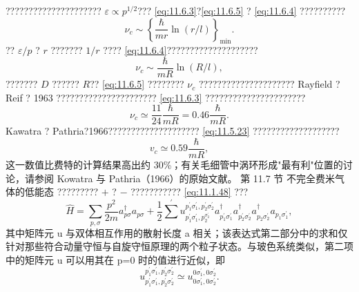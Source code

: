 ????????????????????? \(\varepsilon \propto p^{1/2}\)??? \autoref{eq:11.6.3}?\autoref{eq:11.6.5} ? \autoref{eq:11.6.4} ??????????
\begin{equation}\tag{11.6.4}\label{eq:11.6.4}
\nu _ { c } \sim \left\{ \frac { \hbar } { m r } \ln ( r / l ) \right\} _ { \mathrm { m i n } } .
\end{equation}
?? \(\varepsilon/p\) ? \(r\) ??????? \(1/r\) ???? \autoref{eq:11.6.4}????????????????????
\begin{equation}\tag{11.6.5}\label{eq:11.6.5}
\nu _ { c } \sim \frac { \hbar } { m R } \ln ( R / l ) ,
\end{equation}
??????? \(D\) ?????? \(R\)?? \autoref{eq:11.6.5} ???????? \(\nu_{c}\) ?????????????????????
Rayfield ? Reif ? 1963 ?????????????????????? \autoref{eq:11.6.3} ??????????????????????
\begin{equation}\tag{11.6.6}\label{eq:11.6.6}
\nu _ { c } \simeq \frac { 11 } { 24 } \frac { \hbar } { m R } = 0 . 46 \frac { \hbar } { m R } .
\end{equation}
Kawatra ? Pathria?1966???????????????????? \autoref{eq:11.5.23} ???????????????????
\begin{equation}\tag{11.6.7}\label{eq:11.6.7}
v _ { c } \simeq 0 . 59 \frac { \hbar } { m R } ,
\end{equation}
这一数值比费特的计算结果高出约 30\%；有关毛细管中涡环形成"最有利"位置的讨论，请参阅 Kowatra 与 Pathria（1966）的原始文献。
第 11.7 节 不完全费米气体的低能态
????????? \(+\) ? \(-\) ??????????? \autoref{eq:11.1.48} ???
\begin{equation}\tag{11.6.8}\label{eq:11.6.8}
\hat { H } = \sum _ { p , \sigma } \frac { p ^{2} } { 2 m } a _ { p \sigma } ^{\dagger} a _ { p \sigma } + \frac { 1 } { 2 } \sum ^{\prime} u _ { p _ { 1 } ^{\prime} \sigma _ { 1 } ^{\prime} , p _ { 2 } ^{\sigma _ { 2} ^{\prime} } } ^{p _ { 1} ^{\prime} \sigma _ { 1 } ^{\prime} , p _ { 2 } ^{\prime} \sigma _ { 2 } ^{\prime} } a _ { p _ { 1 } ^{\prime} \sigma _ { 1 } ^{\prime} } ^{\dagger} a _ { p _ { 2 } ^{\prime} \sigma _ { 2 } ^{\prime} } ^{\dagger} a _ { p _ { 2 } \sigma _ { 2 } ^{\prime} } ^{\dagger} a _ { p _ { 1 } \sigma _ { 1 } ^{\prime} } ,
\end{equation}
其中矩阵元 u 与双体相互作用的散射长度 a 相关；该表达式第二部分中的求和仅针对那些符合动量守恒与自旋守恒原理的两个粒子状态。与玻色系统类似，第二项中的矩阵元 u 可以用其在 p=0 时的值进行近似，即
\begin{equation}\tag{11.6.9}\label{eq:11.6.9}
u _ { p _ { 1 } ^{\prime} \sigma _ { 1 } ^{\prime} , p _ { 2 } ^{\prime} \sigma _ { 2 } ^{\prime} } ^{p _ { 1} ^{\prime} \sigma _ { 1 } ^{\prime} , p _ { 2 } ^{\prime} \sigma _ { 2 } ^{\prime} } \simeq u _ { 0 \sigma _ { 1 } ^{\prime} , 0 \sigma _ { 2 } ^{\prime} } ^{0 \sigma _ { 1} ^{\prime} , 0 \sigma _ { 2 } ^{\prime} } .
\end{equation}
